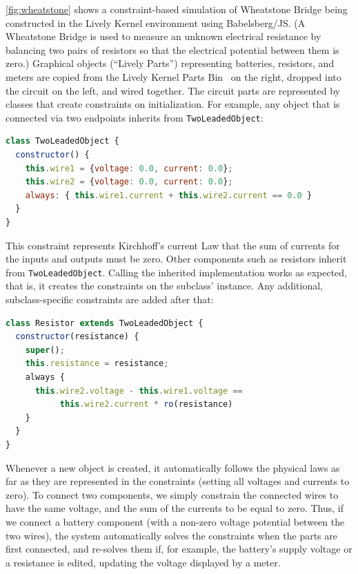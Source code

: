 \autoref{fig:wheatstone} shows a constraint-based simulation of Wheatstone
Bridge being constructed in the Lively Kernel environment using
Babelsberg/JS. (A Wheatstone Bridge is used to measure an unknown electrical
resistance by balancing two pairs of resistors so that the electrical potential
between them is zero.)  Graphical objects (``Lively Parts'') representing
batteries, resistors, and meters are copied from the Lively Kernel Parts
Bin~\cite{lively-partsbin-2012} on the right, dropped into the circuit on the
left, and wired together. The circuit parts are represented by classes that
create constraints on initialization. For example, any object that is connected
via two endpoints inherits from \lstinline{TwoLeadedObject}:
\begin{lstlisting}[language=JavaScript]
class TwoLeadedObject {
  constructor() {
    this.wire1 = {voltage: 0.0, current: 0.0};
    this.wire2 = {voltage: 0.0, current: 0.0};
    always: { this.wire1.current + this.wire2.current == 0.0 }
  }
}
\end{lstlisting}

This constraint represents Kirchhoff's current Law that the sum of currents for
the inputs and outputs must be zero. Other components such as resistors inherit
from \lstinline{TwoLeadedObject}. Calling the inherited implementation works as
expected, that is, it creates the constraints on the subclass' instance. Any
additional, subclass-specific constraints are added after that:
\begin{lstlisting}[language=JavaScript]
class Resistor extends TwoLeadedObject {
  constructor(resistance) {
    super();
    this.resistance = resistance;
    always {
      this.wire2.voltage - this.wire1.voltage ==
           this.wire2.current * ro(resistance)
    }
  }
}
\end{lstlisting}

Whenever a new object is created, it automatically follows the physical laws as
far as they are represented in the constraints (setting all voltages and
currents to zero). To connect two components, we simply constrain the connected
wires to have the same voltage, and the sum of the currents to be equal to
zero. Thus, if we connect a battery component (with a non-zero voltage potential
between the two wires), the system automatically solves the constraints when the
parts are first connected, and re-solves them if, for example, the battery's
supply voltage or a resistance is edited, updating the voltage displayed by a
meter.

